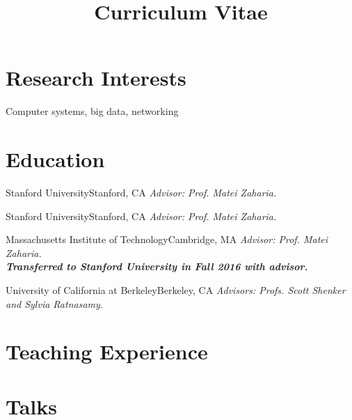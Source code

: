 \documentclass[10pt,letterpaper,sans]{moderncv}
\title{Curriculum Vitae}
\makeatletter
\renewcommand\@biblabel[1]{\textbullet}
\makeatother
\begin{document}
\makecvtitle
\section{Research Interests}
Computer systems, big data, networking

\section{Education}
{Stanford University}{Stanford, CA}{
\emph{Advisor: Prof. Matei Zaharia.}
}{}

{Stanford University}{Stanford, CA}{
\emph{Advisor: Prof. Matei Zaharia.}
}{}

{Massachusetts Institute of Technology}{Cambridge, MA}{
\emph{Advisor: Prof. Matei Zaharia.} \\
\textbf{\emph{Transferred to Stanford University in Fall 2016 with advisor.}}
}{}

{University of California at Berkeley}{Berkeley, CA}{
\emph{Advisors: Profs. Scott Shenker and Sylvia Ratnasamy.}
}{}

\section{Teaching Experience}

 {}
 {}
 {}

\makeatletter
\renewcommand\@biblabel[1]{\textbullet}
\makeatother


\nocite{*}


\section{Talks}
\end{document}

